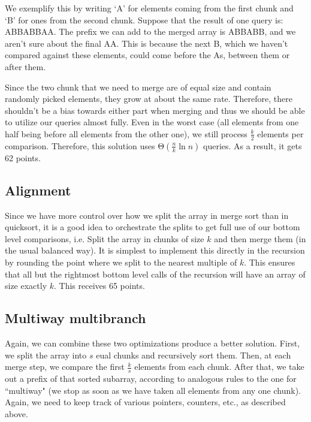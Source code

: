 \documentclass{article}
\begin{document}
We exemplify this by writing `A' for elements coming from the first chunk and `B' for ones from the second chunk. Suppose that the result of one query is: ABBABBAA. The prefix we can add to the merged array is ABBABB, and we aren't sure about the final AA. This is because the next B, which we haven't compared against these elements, could come before the As, between them or after them.

Since the two chunk that we need to merge are of equal size and contain randomly picked elements, they grow at about the same rate. Therefore, there shouldn't be a bias towards either part when merging and thus we should be able to utilize our queries almost fully. Even in the worst case (all elements from one half being before all elements from the other one), we still process $ \frac{k}{2} $ elements per comparison. Therefore, this solution uses $ \mathrm{\Theta}\left( \frac{n}{k} \ln{n} \right) $ queries. As a result, it gets 62 points.

\subsection{Alignment}

Since we have more control over how we split the array in merge sort than in quicksort, it is a good idea to orchestrate the splits to get full use of our bottom level comparisons, i.e. Split the array in chunks of size $ k $ and then merge them (in the usual balanced way). It is simplest to implement this directly in the recursion by rounding the point where we split to the nearest multiple of $k$. This ensures that all but the rightmost bottom level calls of the recursion will have an array of size exactly $k$. This receives 65 points.

\subsection{Multiway multibranch}

Again, we can combine these two optimizations produce a better solution. First, we split the array into $ s $ eual chunks and recursively sort them. Then, at each merge step, we compare the first $ \frac{k}{s} $ elements from each chunk. After that, we take out a prefix of that sorted subarray, according to analogous rules to the one for ``multiway" (we stop as soon as we have taken all elements from any one chunk). Again, we need to keep track of various pointers, counters, etc., as described above. 
\end{document}
